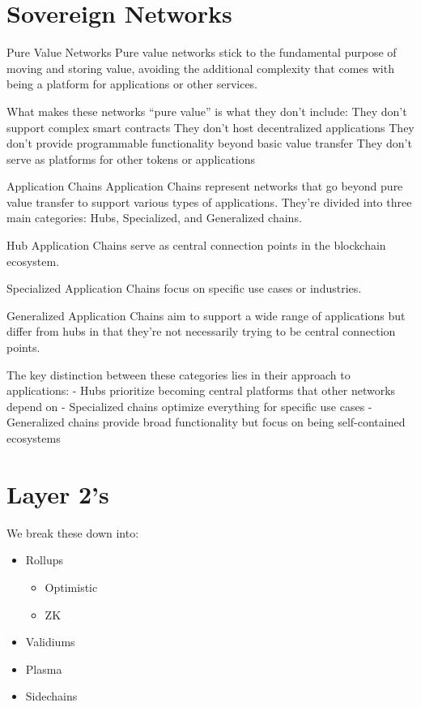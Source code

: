 \documentclass[
  letterpaper,
  DIV=11,
  numbers=noendperiod]{scrreprt}
\providecommand{\tightlist}{%
  \setlength{\itemsep}{0pt}\setlength{\parskip}{0pt}}\usepackage{longtable,booktabs,array}
\begin{document}
\section{Sovereign Networks}\label{sovereign-networks}

Pure Value Networks Pure value networks stick to the fundamental purpose
of moving and storing value, avoiding the additional complexity that
comes with being a platform for applications or other services.

What makes these networks ``pure value'' is what they don't include:
They don't support complex smart contracts They don't host decentralized
applications They don't provide programmable functionality beyond basic
value transfer They don't serve as platforms for other tokens or
applications

Application Chains Application Chains represent networks that go beyond
pure value transfer to support various types of applications. They're
divided into three main categories: Hubs, Specialized, and Generalized
chains.

Hub Application Chains serve as central connection points in the
blockchain ecosystem.

Specialized Application Chains focus on specific use cases or
industries.

Generalized Application Chains aim to support a wide range of
applications but differ from hubs in that they're not necessarily trying
to be central connection points.

The key distinction between these categories lies in their approach to
applications: - Hubs prioritize becoming central platforms that other
networks depend on - Specialized chains optimize everything for specific
use cases - Generalized chains provide broad functionality but focus on
being self-contained ecosystems

\section{Layer 2's}\label{layer-2s}

We break these down into:

\begin{itemize}
\tightlist
\item
  Rollups

  \begin{itemize}
  \tightlist
  \item
    Optimistic
  \item
    ZK
  \end{itemize}
\item
  Validiums
\item
  Plasma
\item
  Sidechains
\end{itemize}
\end{document}
